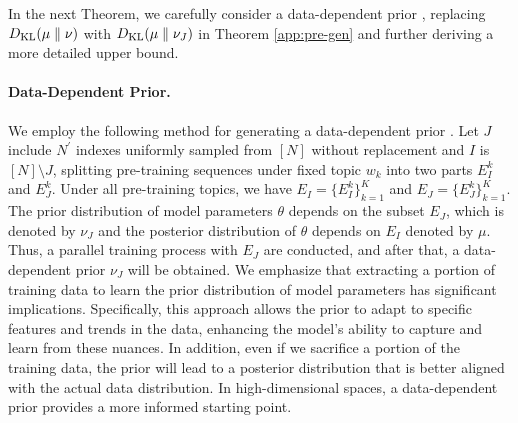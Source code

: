 In the next Theorem, we carefully consider a data-dependent prior \citep{li2019generalization}, replacing $D_{\mathrm{KL}}(\mu\parallel\nu)$ with $D_{\mathrm{KL}}(\mu\parallel\nu_J)$ in Theorem \ref{app:pre-gen} and further deriving a more detailed upper bound.

\paragraph{Data-Dependent Prior.} We employ the following method for generating a data-dependent prior \citep{li2019generalization}. Let $J$ include $N^{\prime}$ indexes uniformly sampled from $[N]$ without replacement and $I$ is $[N]\setminus J$, splitting pre-training sequences under fixed topic $w_k$ into two parts $E^k_I$ and $E^k_J$. Under all pre-training topics, we have $E_I=\{E^k_I\}_{k=1}^K$ and $E_J=\{E^k_J\}_{k=1}^K$. The prior distribution of model parameters $\theta$ depends on the subset $E_J$, which is denoted by $\nu_J$ and the posterior distribution of $\theta$ depends on $E_I$ denoted by $\mu$. Thus, a parallel training process with $E_J$ are conducted, and after that, a data-dependent prior $\nu_J$ will be obtained. We emphasize that extracting a portion of training data to learn the prior distribution of model parameters has significant implications. Specifically, this approach allows the prior to adapt to specific features and trends in the data, enhancing the model's ability to capture and learn from these nuances. In addition, even if we sacrifice a portion of the training data, the prior will lead to a posterior distribution that is better aligned with the actual data distribution. In high-dimensional spaces, a data-dependent prior provides a more informed starting point.


